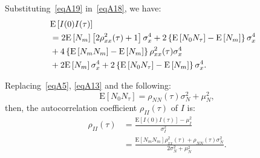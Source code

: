 \documentclass[journal]{IEEEtran}
\begin{document}
Substituting~\eqref{eqA19} in~\eqref{eqA18}, we have:
\begin{equation}
\begin{split}
\lefteqn{\mathrm{E}\left[ I(0)I(\tau) \right]} \\
& =   2 \mathrm{E}\left[N_{m}\right]\left[2\rho_{x x}^{2}(\tau) + 1\right] \sigma_{x}^{4} + 2 \left\{\mathrm{E}\left[ N_{0}N_{\tau}\right]-\mathrm{E}\left[N_{m}\right]\right\} \sigma_{x}^{4} \\
& {}+ 4 \left\{\mathrm{E}\left[N_{m} N_{m}\right]-\mathrm{E}\left[N_{m}\right] \right\} \rho_{x x}^{2}(\tau) \sigma_{x}^{4} \\
& {}+ 2 \mathrm{E}\left[N_{m}\right] \sigma_{x}^{4} + 2 \left\{\mathrm{E}\left[N_{0}N_{\tau}\right]-\mathrm{E}\left[N_{m}\right] \right\} \sigma_{x}^{4}.
\label{eqA20}
\end{split}
\end{equation}

Replacing~\eqref{eqA5}, \eqref{eqA13} and the following:
\begin{equation}
\mathrm{E}\left[ N_{0}N_{\tau}\right] = \rho_{N N}(\tau) \sigma_{N}^{2} + \mu_{N}^{2},
\label{eqA21}
\end{equation}
then, the autocorrelation coefficient $\rho_{I I}(\tau)$ of $I$ is:
\begin{equation}
\begin{split}
\rho_{I I}(\tau) & = \frac{\mathrm{E}[I(0) I(\tau)]-\mu_{I}^{2}}{\sigma_{I}^{2}} \\
& = \frac{\mathrm{E}\left[N_{m} N_{m}\right] \rho_{x x}^{2}(\tau)+\rho_{N N}(\tau) \sigma_{N}^{2}}{2 \sigma_{N}^{2}+\mu_{N}^{2}}.
\label{eqA22}
\end{split}
\end{equation}

\ifCLASSOPTIONcaptionsoff
  \newpage
\fi

\end{document}

